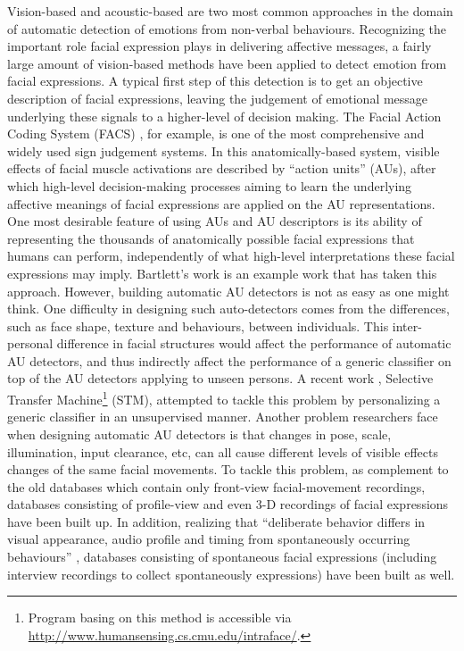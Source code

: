 Vision-based and acoustic-based are two most common approaches in the domain of automatic detection of emotions from non-verbal behaviours. Recognizing the important role facial expression plays in delivering affective messages, a fairly large amount of vision-based methods have been applied to detect emotion from facial expressions. A typical first step of this detection is to get an objective description of facial expressions, leaving the judgement of emotional message underlying these signals to a higher-level of decision making. The Facial Action Coding System (FACS) \cite{ekm02}, for example, is one of the most comprehensive and widely used sign judgement systems. In this anatomically-based system, visible effects of facial muscle activations are described by ``action units'' (AUs), after which high-level decision-making processes aiming to learn the underlying affective meanings of facial expressions are applied on the AU representations. One most desirable feature of using AUs and AU descriptors is its ability of representing the thousands of anatomically possible facial expressions that humans can perform, independently of what high-level interpretations these facial expressions may imply. Bartlett's work \cite{bartlett2005recognizing} is an example work that has taken this approach. However, building automatic AU detectors is not as easy as one might think. One difficulty in designing such auto-detectors comes from the differences, such as face shape, texture and behaviours, between individuals. This inter-personal difference in facial structures would affect the performance of automatic AU detectors, and thus indirectly affect the performance of a generic classifier on top of the AU detectors applying to unseen persons. A recent work \cite{chu2013selective}, Selective Transfer Machine\footnote{Program basing on this method is accessible via \url{http://www.humansensing.cs.cmu.edu/intraface/}.} (STM), attempted to tackle this problem by personalizing a generic classifier in an unsupervised manner. Another problem researchers face when designing automatic AU detectors is that changes in pose, scale, illumination, input clearance, etc, can all cause different levels of visible effects changes of the same facial movements. To tackle this problem, as complement to the old databases which contain only front-view facial-movement recordings, databases consisting of profile-view \cite{pantic2005web} and even 3-D recordings \cite{yin20063d} of facial expressions have been built up. In addition, realizing that ``deliberate behavior differs in visual appearance, audio profile and timing from spontaneously occurring behaviours'' \cite{zeng2009survey}, databases consisting of spontaneous facial expressions (including interview recordings to collect spontaneously expressions) have been built as well.

